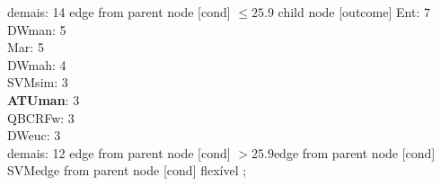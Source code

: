 {{{{%
demais: 14} edge from parent node [cond] {$\leq25.9$}}
child {node [outcome] {
Ent: 7\\
DWman: 5\\
Mar: 5\\
DWmah: 4\\
SVMsim: 3\\
\textbf{ATUman}: 3\\
QBCRFw: 3\\
DWeuc: 3\\
demais: 12} edge from parent node [cond] {$>25.9$}}edge from parent node [cond] {SVM}}edge from parent node [cond] {flexível}}
%
;
